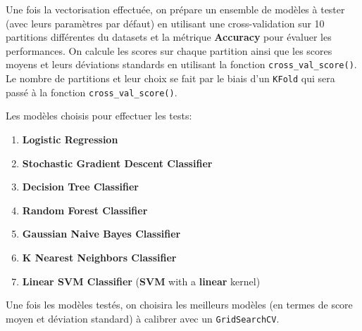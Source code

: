 \documentclass[11pt]{article}
\begin{document}
Une fois la vectorisation effectuée, on prépare un ensemble de modèles à
tester (avec leurs paramètres par défaut) en utilisant une
cross-validation sur 10 partitions différentes du datasets et la
métrique \textbf{Accuracy} pour évaluer les performances. On calcule les
scores sur chaque partition ainsi que les scores moyens et leurs
déviations standards en utilisant la fonction
\texttt{cross\_val\_score()}. Le nombre de partitions et leur choix se
fait par le biais d'un \texttt{KFold} qui sera passé à la fonction
\texttt{cross\_val\_score()}.

Les modèles choisis pour effectuer les tests:
\begin{enumerate}
  \item \textbf{Logistic Regression}
  \item \textbf{Stochastic Gradient Descent Classifier}
  \item \textbf{Decision Tree Classifier}
  \item \textbf{Random Forest Classifier}
  \item \textbf{Gaussian Naive Bayes Classifier}
  \item \textbf{K Nearest Neighbors Classifier}
  \item \textbf{Linear SVM Classifier} (\textbf{SVM} with a \textbf{linear} kernel)
\end{enumerate}

Une fois les modèles testés, on choisira les meilleurs modèles (en
termes de score moyen et déviation standard) à calibrer avec un
\texttt{GridSearchCV}.


\end{document}
